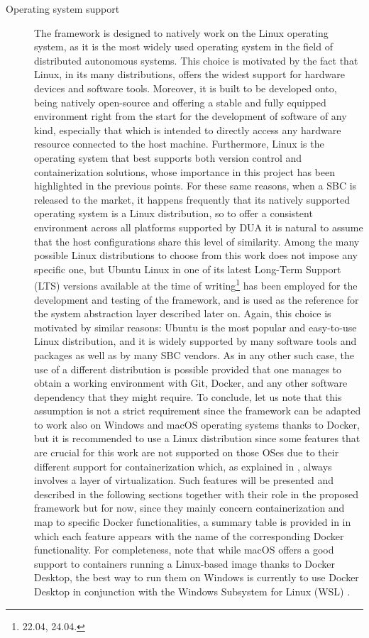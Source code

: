 \begin{description}
  \item[Operating system support] The framework is designed to natively work on the Linux operating system, as it is the most widely used operating system in the field of distributed autonomous systems. This choice is motivated by the fact that Linux, in its many distributions, offers the widest support for hardware devices and software tools. Moreover, it is built to be developed onto, being natively open-source and offering a stable and fully equipped environment right from the start for the development of software of any kind, especially that which is intended to directly access any hardware resource connected to the host machine. Furthermore, Linux is the operating system that best supports both version control and containerization solutions, whose importance in this project has been highlighted in the previous points. For these same reasons, when a SBC is released to the market, it happens frequently that its natively supported operating system is a Linux distribution, so to offer a consistent environment across all platforms supported by DUA it is natural to assume that the host configurations share this level of similarity. Among the many possible Linux distributions to choose from this work does not impose any specific one, but Ubuntu Linux in one of its latest Long-Term Support (LTS) versions available at the time of writing\footnote{22.04, 24.04.} has been employed for the development and testing of the framework, and is used as the reference for the system abstraction layer described later on. Again, this choice is motivated by similar reasons: Ubuntu is the most popular and easy-to-use Linux distribution, and it is widely supported by many software tools and packages as well as by many SBC vendors. As in any other such case, the use of a different distribution is possible provided that one manages to obtain a working environment with Git, Docker, and any other software dependency that they might require. To conclude, let us note that this assumption is not a strict requirement since the framework can be adapted to work also on Windows and macOS operating systems thanks to Docker, but it is recommended to use a Linux distribution since some features that are crucial for this work are not supported on those OSes due to their different support for containerization which, as explained in , always involves a layer of virtualization. Such features will be presented and described in the following sections together with their role in the proposed framework but for now, since they mainly concern containerization and map to specific Docker functionalities, a summary table is provided in  in which each feature appears with the name of the corresponding Docker functionality. For completeness, note that while macOS offers a good support to containers running a Linux-based image thanks to Docker Desktop, the best way to run them on Windows is currently to use Docker Desktop in conjunction with the Windows Subsystem for Linux (WSL) \cite{microsoft_windows_nodate}.

\end{description}

